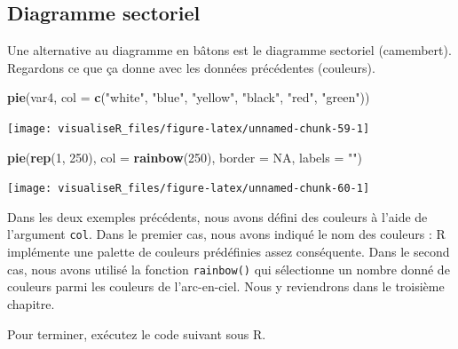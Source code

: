 \documentclass[]{article}
\newenvironment{Shaded}{\begin{snugshade}}{\end{snugshade}}
\newcommand{\DataTypeTok}[1]{\textcolor[rgb]{0.13,0.29,0.53}{#1}}
\newcommand{\DecValTok}[1]{\textcolor[rgb]{0.00,0.00,0.81}{#1}}
\newcommand{\KeywordTok}[1]{\textcolor[rgb]{0.13,0.29,0.53}{\textbf{#1}}}
\newcommand{\NormalTok}[1]{#1}
\newcommand{\OtherTok}[1]{\textcolor[rgb]{0.56,0.35,0.01}{#1}}
\newcommand{\StringTok}[1]{\textcolor[rgb]{0.31,0.60,0.02}{#1}}
\begin{document}
\hypertarget{diagramme-sectoriel}{%
\subsection{Diagramme sectoriel}\label{diagramme-sectoriel}}

Une alternative au diagramme en bâtons est le diagramme sectoriel (camembert). Regardons ce que ça donne avec les données précédentes (couleurs).

\begin{Shaded}
\begin{Highlighting}[]
\KeywordTok{pie}\NormalTok{(var4, }\DataTypeTok{col =} \KeywordTok{c}\NormalTok{(}\StringTok{"white"}\NormalTok{, }\StringTok{"blue"}\NormalTok{, }\StringTok{"yellow"}\NormalTok{, }\StringTok{"black"}\NormalTok{, }\StringTok{"red"}\NormalTok{, }\StringTok{"green"}\NormalTok{))}
\end{Highlighting}
\end{Shaded}

\begin{center}\texttt{[image: visualiseR\_files/figure-latex/unnamed-chunk-59-1]} \end{center}

\begin{Shaded}
\begin{Highlighting}[]
\KeywordTok{pie}\NormalTok{(}\KeywordTok{rep}\NormalTok{(}\DecValTok{1}\NormalTok{, }\DecValTok{250}\NormalTok{), }\DataTypeTok{col =} \KeywordTok{rainbow}\NormalTok{(}\DecValTok{250}\NormalTok{), }\DataTypeTok{border =} \OtherTok{NA}\NormalTok{, }\DataTypeTok{labels =} \StringTok{""}\NormalTok{)}
\end{Highlighting}
\end{Shaded}

\begin{center}\texttt{[image: visualiseR\_files/figure-latex/unnamed-chunk-60-1]} \end{center}

Dans les deux exemples précédents, nous avons défini des couleurs à l'aide de l'argument \texttt{col}. Dans le premier cas, nous avons indiqué le nom des couleurs : R implémente une palette de couleurs prédéfinies assez conséquente. Dans le second cas, nous avons utilisé la fonction \texttt{rainbow()} qui sélectionne un nombre donné de couleurs parmi les couleurs de l'arc-en-ciel. Nous y reviendrons dans le troisième chapitre.

Pour terminer, exécutez le code suivant sous R.
\end{document}

